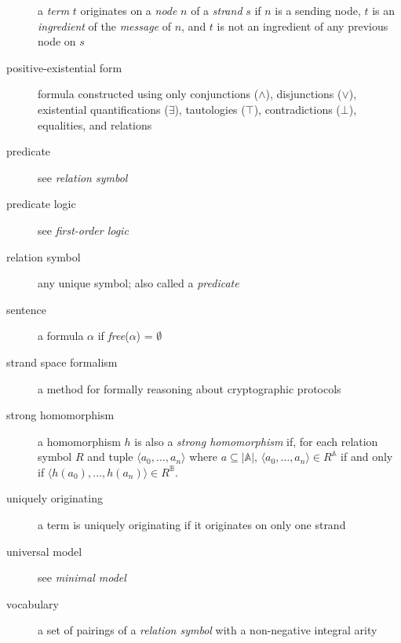 \begin{description}
			a \emph{term} $t$ originates on a \emph{node} $n$ of a
			\emph{strand} $s$ if $n$ is a sending node, $t$ is an
			\emph{ingredient} of the \emph{message} of $n$, and $t$ is not an
			ingredient of any previous node on $s$
		\item[positive-existential form]
			formula constructed using only conjunctions ($\wedge$),
			disjunctions ($\vee$), existential quantifications ($\exists$),
			tautologies ($\top$), contradictions ($\bot$), equalities, and
			relations
		\item[predicate]
			see \emph{relation symbol}
		\item[predicate logic]
			see \emph{first-order logic}
		\item[relation symbol]
			any unique symbol; also called a \emph{predicate}
		\item[sentence]
			a formula $\alpha$ if \emph{free}($\alpha$) = $\emptyset$
		\item[strand space formalism]
			a method for formally reasoning about cryptographic protocols
		\item[strong homomorphism]
			a homomorphism $h$ is also a \emph{strong homomorphism} if, for each
			relation symbol $R$ and tuple $\langle a_0 , \ldots , a_n \rangle$
			where $a \subseteq |\mathbb{A}|$, $\langle a_0 , \ldots , a_n  \rangle
			\in R^\mathbb{A}$ if and only if $\langle h(a_0) , \ldots , h(a_n)
			\rangle \in R^\mathbb{B}$.
		\item[uniquely originating]
			a term is uniquely originating if it originates on only one strand
		\item[universal model]
			see \emph{minimal model}
		\item[vocabulary]
			a set of pairings of a \emph{relation symbol} with a non-negative
			integral arity
	\end{description}
